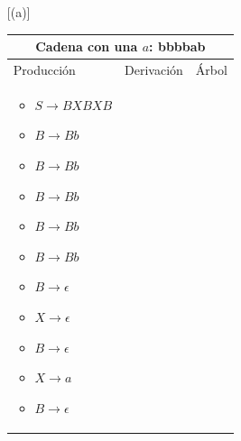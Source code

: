\documentclass{article}
\begin{document}
\begin{enumerate} [(a)]
        \begin{tabular}{|p{3.5cm}|p{3.5cm}|p{8cm}|  }
         \hline
         \multicolumn{3}{|c|}{Cadena con una  $a$: bbbbab} \\
         \hline
         Producción & Derivación & Árbol\\
         \hline
         \begin{itemize}[label={}]
             
         \item $S\to BXBXB$ 
         \item $B \to Bb$	
         \item $B \to Bb$	
         \item $B \to Bb$	
         \item $B \to Bb$	
         \item $B \to Bb$	
         \item $B \to \epsilon$	
         \item $X \to \epsilon$	
         \item $B \to \epsilon$	
         \item $X \to a$	
         \item $B \to \epsilon$
         
        \end{itemize}
        &
         \begin{itemize}[label={}]
             

\end{itemize}
\end{tabular}
\end{enumerate}
\end{document}
